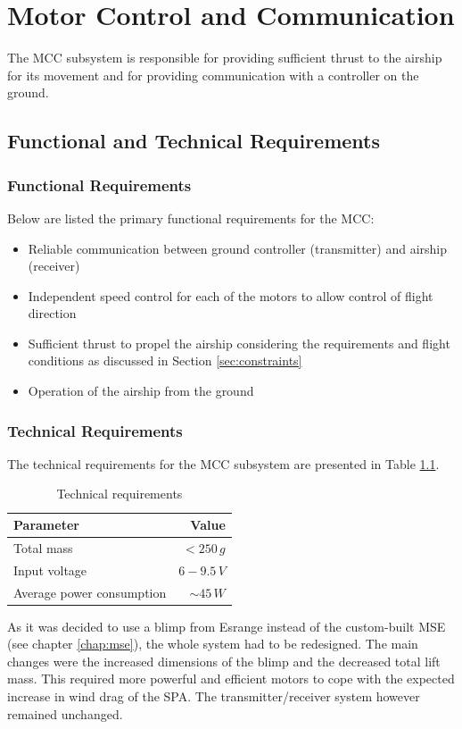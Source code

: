 \chapter{Motor Control and Communication}
\label{chap:mcc}

The \ac{MCC} subsystem is responsible for providing sufficient thrust to the airship for its movement and for providing communication with a controller on the ground.
%
\section{Functional and Technical Requirements}
%
\subsection{Functional Requirements}
%
Below are listed the primary functional requirements for the \ac{MCC}:
%
\begin{itemize}
\item Reliable communication between ground controller (transmitter) and airship (receiver)
\item Independent speed control for each of the motors to allow control of flight direction
\item Sufficient thrust to propel the airship considering the requirements and flight conditions as discussed in Section \ref{sec:constraints}
\item Operation of the airship from the ground 
\end{itemize}
%
\subsection{Technical Requirements}
%
The technical requirements for the \ac{MCC} subsystem are presented in Table \ref{tab:technical_requirements_mcc}.
%
\begin{table}[H]
\centering
\caption{Technical requirements}
\label{tab:technical_requirements_mcc}
\begin{tabular}{l r}
\hline
\textbf{Parameter} & \textbf{Value}\\ \hline
Total mass & $<250\,g$\\
Input voltage & $6-9.5\,V$\\
Average power consumption & $\sim 45\,W$\\
\hline
\end{tabular}
\end{table}
%
\noindent
As it was decided to use a blimp from Esrange instead of the custom-built \ac{MSE} (see chapter \ref{chap:mse}), the whole system had to be redesigned. The main changes were the increased dimensions of the blimp and the decreased total lift mass. This required more powerful and efficient motors to cope with the expected increase in wind drag of the \ac{SPA}. The transmitter/receiver system however remained unchanged.
%

